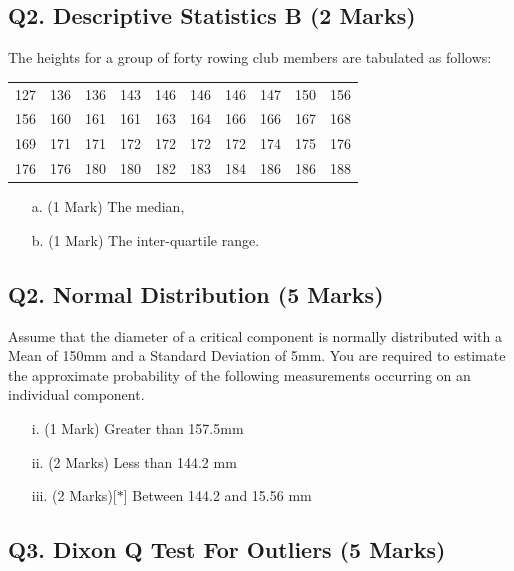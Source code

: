 \documentclass[a4paper,12pt]{article}
\begin{document}
\subsection*{Q2. Descriptive Statistics B (2 Marks)} %
The heights for a group of forty rowing club members are tabulated as follows:

\begin{table}[ht]
	\begin{center}
		\begin{tabular}{|rrrrrrrrrr|}
			
			\hline
			127& 136& 136& 143& 146& 146& 146& 147& 150& 156\\
			156& 160& 161& 161& 163& 164& 166& 166& 167& 168\\
			169& 171& 171& 172& 172& 172& 172& 174& 175& 176\\
			176& 176& 180& 180& 182& 183& 184& 186& 186& 188\\
			\hline
		\end{tabular}
	\end{center}
\end{table}
\vspace{-0.5cm}
\begin{itemize}
	\item[a.] (1 Mark) The median,
	\item[b.] (1 Mark) The inter-quartile range.
\end{itemize}



\subsection*{Q2. Normal Distribution (5 Marks)} %
Assume that the diameter of a critical component is normally distributed with a Mean of 150mm and a Standard Deviation of 5mm. You are required  to estimate the approximate probability of the following measurements occurring on an individual component.
\begin{itemize}
	\item [i.](1 Mark)	Greater than 157.5mm
	\item [ii.](2 Marks) Less than 144.2 mm
	\item [iii.](2 Marks)[$\ast$] Between 144.2 and 15.56 mm
\end{itemize}
\bigskip


\subsection*{Q3. Dixon Q Test For Outliers (5 Marks)}
\end{document}
